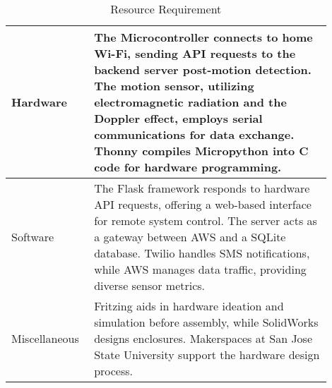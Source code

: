 \begin{table}[htbp]
    \begin{center}
        \begin{tabular}{|p{0.2\linewidth}|p{0.7\linewidth}|}
            \hline
            Hardware & The Microcontroller connects to home Wi-Fi, sending API requests to the backend server post-motion detection. The motion sensor, utilizing electromagnetic radiation and the Doppler effect, employs serial communications for data exchange. Thonny compiles Micropython into C code for hardware programming.
            \\
            \hline
            Software & The Flask framework responds to hardware API requests, offering a web-based interface for remote system control. The server acts as a gateway between AWS and a SQLite database. Twilio handles SMS notifications, while AWS manages data traffic, providing diverse sensor metrics.
            \\
            \hline
            Miscellaneous & Fritzing aids in hardware ideation and simulation before assembly, while SolidWorks designs enclosures. Makerspaces at San Jose State University support the hardware design process. \\
            \hline
        \end{tabular}
        \label{tab1}
    \end{center}
    \caption{Resource Requirement}
\end{table}